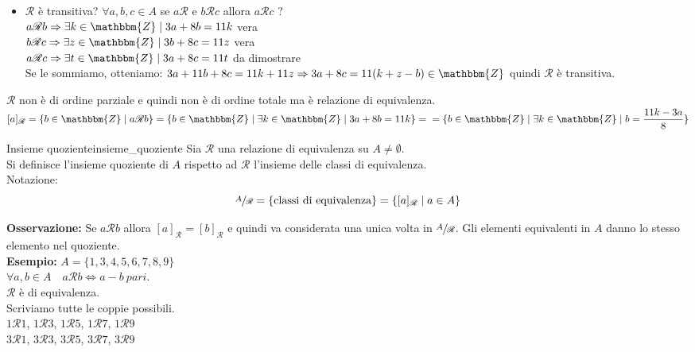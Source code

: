 \documentclass[12pt, letterpaper]{report}
\newcounter{definition}
\newcommand{\nmu}{}
\begin{document}
\begin{itemize}
		\item $\mathscr{R}$ è transitiva? $\forall a,b,c \in A$ se $a \mathscr{R}$ e $b \mathscr{R} c$ allora $a \mathscr{R} c$ ? \\
			$a \mathscr{R} b \Rightarrow \exists k \in \mathbbm{Z} \mid 3a + 8b = 11k$ vera\\
			$b \mathscr{R} c \Rightarrow \exists z \in \mathbbm{Z} \mid 3b + 8c = 11z$ vera\\
			$a \mathscr{R} c \Rightarrow \exists t \in \mathbbm{Z} \mid 3a + 8c = 11t$ da dimostrare\\
			Se le sommiamo, otteniamo: $3a + 11b + 8c = 11k + 11z \Rightarrow 3a + 8c = 11(k + z - b) \in \mathbbm{Z}$ quindi $\mathscr{R}$ è transitiva.
		\end{itemize}
		$\mathscr{R}$ non è di ordine parziale e quindi non è di ordine totale ma è relazione di equivalenza. \\
		$[a]_\mathscr{R} = \{b \in \mathbbm{Z} \mid a \mathscr{R} b\} = \{b \in \mathbbm{Z} \mid \exists k \in \mathbbm{Z} \mid 3a + 8b = 11k\} = \\ = \{b \in \mathbbm{Z} \mid \exists k \in \mathbbm{Z} \mid b = \dfrac{11k - 3a}{8}\}$
		\begin{definition}{\nmu Insieme quoziente}{insieme_quoziente}
			Sia $\mathscr{R}$ una relazione di equivalenza su $A \neq \emptyset$. \\
			Si definisce l'insieme quoziente di $A$ rispetto ad $\mathscr{R}$ l'insieme delle classi di equivalenza. \\
			Notazione:
			\[
			\sfrac{A}{\mathscr{R}} = \{\text{classi di equivalenza} \} = \{[a]_\mathscr{R} \mid a \in A\}
			\]
		\end{definition}
		\textbf{Osservazione:} Se $a\mathscr{R}b$ allora $[a]_\mathscr{R} = [b]_\mathscr{R}$ e quindi va considerata una unica volta in $\sfrac{A}{\mathscr{R}}$. Gli elementi equivalenti in $A$ danno lo stesso elemento nel quoziente. \\
		\textbf{Esempio:} $A = \{1,3,4,5,6,7,8,9\}$ \\
		$\forall a,b \in A \quad a\mathscr{R}b \iff a - b\ pari$. \\
		$\mathscr{R}$ è di equivalenza. \\
		Scriviamo tutte le coppie possibili. \\
		$1\mathscr{R}1$, $1\mathscr{R}3$, $1\mathscr{R}5$, $1\mathscr{R}7$, $1\mathscr{R}9$ \\
		$3\mathscr{R}1$, $3\mathscr{R}3$, $3\mathscr{R}5$, $3\mathscr{R}7$, $3\mathscr{R}9$ \\
\end{document}
